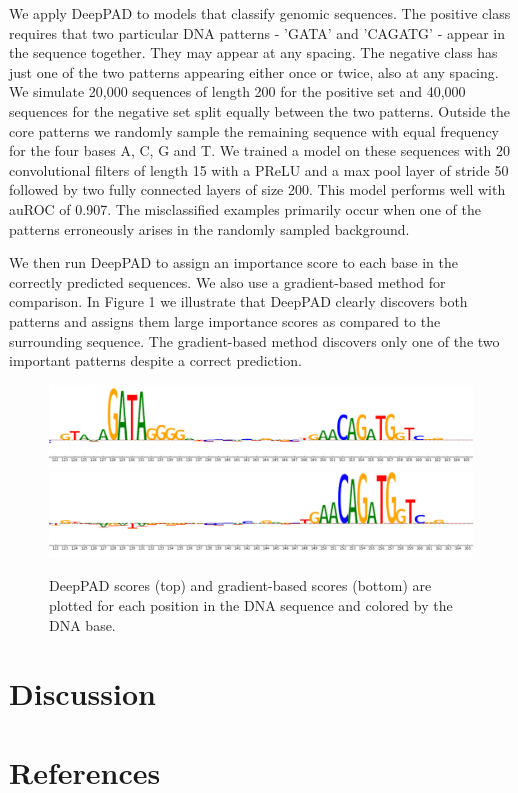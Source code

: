 \documentclass{article}
\begin{document}
We apply DeepPAD to models that classify genomic sequences. The positive class requires that two particular DNA patterns - 'GATA' and 'CAGATG' - appear in the sequence together. They may appear at any spacing. The negative class has just one of the two patterns appearing either once or twice, also at any spacing. We simulate 20,000 sequences of length 200 for the positive set and 40,000 sequences for the negative set split equally between the two patterns. Outside the core patterns we randomly sample the remaining sequence with equal frequency for the four bases A, C, G and T. We trained a model on these sequences with 20 convolutional filters of length 15 with a PReLU and a max pool layer of stride 50 followed by two fully connected layers of size 200. This model performs well with auROC of 0.907. The misclassified examples primarily occur when one of the patterns erroneously arises in the randomly sampled background.  %

We then run DeepPAD to assign an importance score to each base in the correctly predicted sequences. We also use a gradient-based method for comparison. In Figure 1 we illustrate that DeepPAD clearly discovers both patterns and assigns them large importance scores as compared to the surrounding sequence. The gradient-based method discovers only one of the two important patterns despite a correct prediction.

\begin{figure}[!htmb]
\begin{center}
\includegraphics[scale=0.3]{DeepPADSequence2.png}
\includegraphics[scale=0.3]{GradientSequence2.png}
\caption{DeepPAD scores (top) and gradient-based scores (bottom) are plotted for each position in the DNA sequence and colored by the DNA base.}
\end{center}
\end{figure}
 

\section{Discussion}

\section{References}
\end{document}
